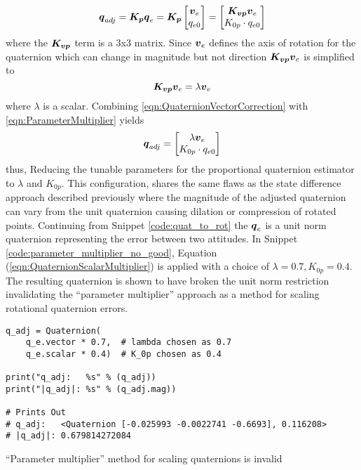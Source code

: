 \begin{equation}
  \boldsymbol{q}_{adj} = \boldsymbol{K_p} \boldsymbol{q}_e
    = \boldsymbol{K_p} \begin{bmatrix} \boldsymbol{v}_e \\ q_{e0} \end{bmatrix}
    = \begin{bmatrix} \boldsymbol{K_{vp}}\boldsymbol{v}_e \\ K_{0p} \cdot q_{e0} \end{bmatrix}
  \label{eqn:ParameterMultiplier}
\end{equation}
where the $\boldsymbol{K_{vp}}$ term is a 3x3 matrix.  Since $\boldsymbol{v}_e$ defines the axis of rotation for the quaternion which can change in magnitude but not direction $\boldsymbol{K_{vp}}\boldsymbol{v}_e$ is simplified to
\begin{equation}
  \boldsymbol{K_{vp}} \boldsymbol{v}_e = \lambda \boldsymbol{v}_e
  \label{eqn:QuaternionVectorCorrection}
\end{equation}
where $\lambda$ is a scalar.
Combining \ref{eqn:QuaternionVectorCorrection} with \ref{eqn:ParameterMultiplier} yields
\begin{equation}
  \boldsymbol{q}_{adj} = \begin{bmatrix} \lambda \boldsymbol{v}_e \\ K_{0p} \cdot q_{e0} \end{bmatrix}
  \label{eqn:QuaternionScalarMultiplier}
\end{equation}
thus, Reducing the tunable parameters for the proportional quaternion estimator to $\lambda$ and $K_{0p}$.  This configuration, shares the same flaws as the state difference approach described previously where the magnitude of the adjusted quaternion can vary from the unit quaternion causing dilation or compression of rotated points.  Continuing from Snippet \ref{code:quat_to_rot} the $\boldsymbol{q}_e$ is a unit norm quaternion representing the error between two attitudes.  In Snippet \ref{code:parameter_multiplier_no_good}, Equation (\ref{eqn:QuaternionScalarMultiplier}) is applied with a choice of $\lambda = 0.7, K_{0p} = 0.4$.  The resulting quaternion is shown to have broken the unit norm restriction invalidating the ``parameter multiplier'' approach as a method for scaling rotational quaternion errors.
\begin{listing}
\begin{singlespace}
  \begin{verbatim}
q_adj = Quaternion(
    q_e.vector * 0.7,  # lambda chosen as 0.7
    q_e.scalar * 0.4)  # K_0p chosen as 0.4

print("q_adj:   %s" % (q_adj))
print("|q_adj|: %s" % (q_adj.mag))

# Prints Out
# q_adj:   <Quaternion [-0.025993 -0.0022741 -0.6693], 0.116208>
# |q_adj|: 0.679814272084
  \end{verbatim}
\caption{``Parameter multiplier'' method for scaling quaternions is invalid}
\label{code:parameter_multiplier_no_good}
\nocite{minted}
\end{singlespace}
\end{listing}


